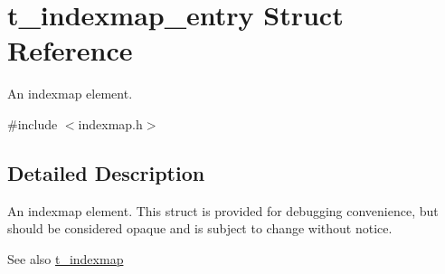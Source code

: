 \hypertarget{structt__indexmap__entry}{
\section{t\_\-indexmap\_\-entry Struct Reference}
\label{structt__indexmap__entry}
}


An indexmap element.  


{\ttfamily \#include $<$indexmap.h$>$}

\subsection{Detailed Description}
An indexmap element. This struct is provided for debugging convenience, but should be considered opaque and is subject to change without notice.

\begin{DoxySeeAlso}{See also}
\hyperlink{structt__indexmap}{t\_\-indexmap} 
\end{DoxySeeAlso}
